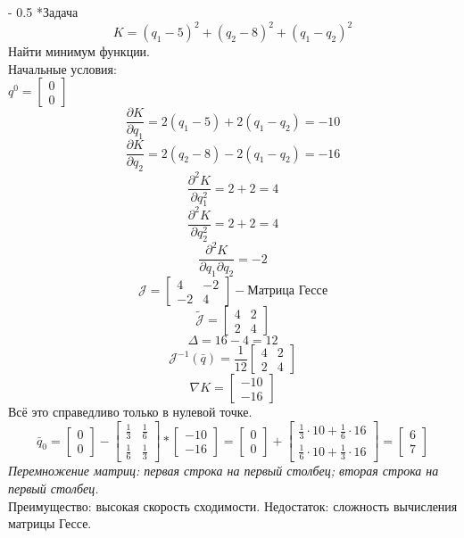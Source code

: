 \documentclass[12pt,a5paper]{scrbook}
\makeatletter
\renewcommand\paragraph{\@startsection{paragraph}{4}{0mm}%
{-\baselineskip} %
{0.5\baselineskip} %
{\normalfont\bfseries}}%
\makeatother
\begin{document}
  \paragraph*{Задача}
  $$K = (q_1 - 5)^2 + (q_2 - 8)^2 + (q_1 - q_2)^2$$
  Найти минимум функции.\\
  Начальные условия:\\
  $q^0 = 
  \begin{bmatrix}
    0 \\ 
    0    
  \end{bmatrix}$
  $$\frac{\partial K}{\partial q_1} = 2(q_1 - 5) + 2(q_1 - q_2) = -10$$
  $$\frac{\partial K}{\partial q_2} = 2(q_2 - 8) - 2(q_1 - q_2) = -16$$
  $$\frac{\partial^2K}{\partial q_1^2} = 2 + 2 = 4$$
  $$\frac{\partial^2K}{\partial q_2^2} = 2 + 2 = 4$$
  $$\frac{\partial^2K}{\partial q_1 \partial q_2} = -2$$  
  $$\mathcal{J} = 
  \begin{bmatrix}
    4 & -2 \\
    -2 & 4
  \end{bmatrix} - \text{Матрица Гессе}$$
  $$\mathcal{\tilde{J}} = 
  \begin{bmatrix}
    4 & 2 \\
    2 & 4
  \end{bmatrix}  
  $$
  $$\Delta = 16 - 4 = 12$$
  $$\mathcal{J}^{-1}(\bar{q}) = \frac{1}{12}\begin{bmatrix}
    4 & 2 \\
    2 & 4
  \end{bmatrix}$$
  $$\nabla K = \begin{bmatrix}
    -10 \\
    -16
  \end{bmatrix}$$
  Всё это справедливо только в нулевой точке.
  $$\bar{q}_0 = \begin{bmatrix}
    0 \\
    0
  \end{bmatrix} - \begin{bmatrix}
    \frac{1}{3} & \frac{1}{6} \\[0.3em]
    \frac{1}{6} & \frac{1}{3}
  \end{bmatrix} \ast \begin{bmatrix}
    -10 \\
    -16
  \end{bmatrix} = \begin{bmatrix}
    0 \\
    0
  \end{bmatrix} + \begin{bmatrix}
    \frac{1}{3}\cdot 10 + \frac{1}{6}\cdot 16 \\
    \frac{1}{6}\cdot 10 + \frac{1}{3}\cdot 16
  \end{bmatrix} = \begin{bmatrix}
    6 \\
    7
  \end{bmatrix}$$
  \textit{Перемножение матриц: первая строка на первый столбец; вторая строка на первый столбец.}\\
  Преимущество: высокая скорость сходимости.
  Недостаток: сложность вычисления матрицы Гессе. 
\end{document}
